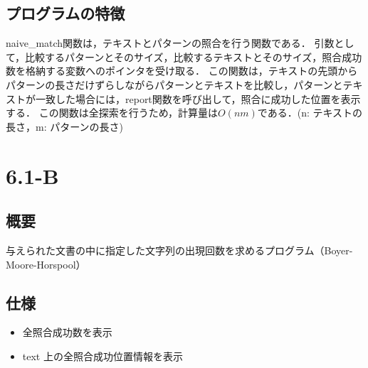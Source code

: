 \documentclass{ltjsarticle}
\begin{document}
\subsection{プログラムの特徴}
naive\_match関数は，テキストとパターンの照合を行う関数である．
引数として，比較するパターンとそのサイズ，比較するテキストとそのサイズ，照合成功数を格納する変数へのポインタを受け取る．
この関数は，テキストの先頭からパターンの長さだけずらしながらパターンとテキストを比較し，パターンとテキストが一致した場合には，report関数を呼び出して，照合に成功した位置を表示する．
この関数は全探索を行うため，計算量は$O(nm)$である．(n: テキストの長さ，m: パターンの長さ)

\section{6.1-B}
\subsection{概要}
与えられた文書の中に指定した文字列の出現回数を求めるプログラム（Boyer-Moore-Horspool）

\subsection{仕様}
\begin{itemize}
  \item 全照合成功数を表示
  \item text 上の全照合成功位置情報を表示
\end{itemize}
\end{document}
